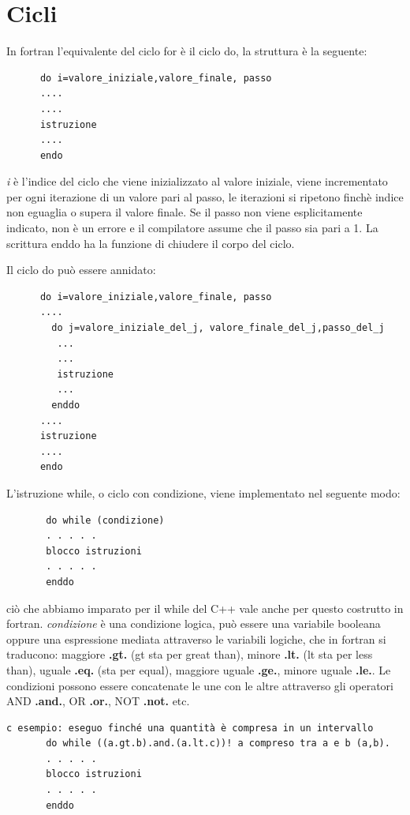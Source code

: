 \documentclass[11pt,fleqn]{book} %
\begin{document}
\section{Cicli}

In fortran l'equivalente del ciclo for è il ciclo do, la struttura è la seguente:
\begin{verbatim}
      do i=valore_iniziale,valore_finale, passo
      ....
      ....
      istruzione
      ....
      endo 
\end{verbatim}

\textit{i} è l'indice del ciclo che viene inizializzato al valore iniziale,  viene incrementato per ogni iterazione di un valore pari al passo, le iterazioni si ripetono finchè indice non eguaglia o supera il valore finale.
Se il passo non viene esplicitamente indicato, non è un errore e il compilatore assume che il passo sia pari a 1. La scrittura enddo ha la funzione di chiudere il corpo del ciclo.

Il ciclo do può essere annidato:
\begin{verbatim}
      do i=valore_iniziale,valore_finale, passo
      ....
      	do j=valore_iniziale_del_j, valore_finale_del_j,passo_del_j
      	 ...
      	 ...
      	 istruzione
      	 ...
      	enddo
      ....
      istruzione
      ....
      endo 
\end{verbatim}

L'istruzione while, o ciclo con condizione, viene implementato nel seguente modo:
\begin{verbatim}
       do while (condizione)
       . . . . . 
       blocco istruzioni 
       . . . . . 
       enddo 
\end{verbatim}
ciò che abbiamo imparato per il while del C++ vale anche per questo costrutto in fortran. \textit{condizione} è una condizione logica, può essere una variabile booleana oppure una espressione mediata attraverso le variabili logiche, che in fortran si traducono: maggiore \textbf{.gt.} (gt sta per great than), minore \textbf{.lt.} (lt sta per less than), uguale \textbf{.eq.} (sta per equal), maggiore uguale \textbf{.ge.}, minore uguale \textbf{.le.}. Le condizioni possono essere concatenate le une con le altre attraverso gli operatori AND \textbf{.and.}, OR \textbf{.or.}, NOT \textbf{.not.} etc.
 
\begin{verbatim}
c esempio: eseguo finché una quantità è compresa in un intervallo
       do while ((a.gt.b).and.(a.lt.c))! a compreso tra a e b (a,b).
       . . . . . 
       blocco istruzioni 
       . . . . . 
       enddo 
\end{verbatim}
\end{document}
